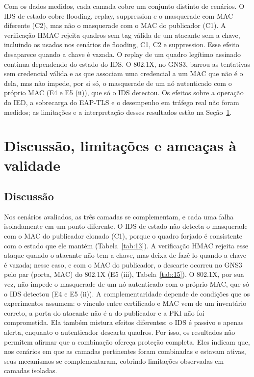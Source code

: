 \documentclass[12pt]{article}
\begin{document}
Com os dados medidos, cada camada cobre um conjunto distinto de cenários. O IDS de estado cobre flooding, replay, suppression e o masquerade com MAC diferente (C2), mas não o masquerade com o MAC do publicador (C1). A verificação HMAC rejeita quadros sem tag válida de um atacante sem a chave, incluindo os usados nos cenários de flooding, C1, C2 e suppression. Esse efeito desaparece quando a chave é vazada. O replay de um quadro legítimo assinado continua dependendo do estado do IDS. O 802.1X, no GNS3, barrou as tentativas sem credencial válida e as que associam uma credencial a um MAC que não é o dela, mas não impede, por si só, o masquerade de um nó autenticado com o próprio MAC (E4 e E5 (ii)), que só o IDS detectou. Os efeitos sobre a operação do IED, a sobrecarga do EAP-TLS e o desempenho em tráfego real não foram medidos; as limitações e a interpretação desses resultados estão na Seção~\ref{sec:7}.

\section{Discussão, limitações e ameaças à validade}\label{sec:7}

\subsection{Discussão}\label{sec:7.1}

Nos cenários avaliados, as três camadas se complementam, e cada uma falha isoladamente em um ponto diferente. O IDS de estado não detecta o masquerade com o MAC do publicador clonado (C1), porque o quadro forjado é consistente com o estado que ele mantém (Tabela~\ref{tab:13}). A verificação HMAC rejeita esse ataque quando o atacante não tem a chave, mas deixa de fazê-lo quando a chave é vazada; nesse caso, e com o MAC do publicador, o descarte ocorreu no GNS3 pelo par (porta, MAC) do 802.1X (E5 (iii), Tabela~\ref{tab:15}). O 802.1X, por sua vez, não impede o masquerade de um nó autenticado com o próprio MAC, que só o IDS detectou (E4 e E5 (ii)). A complementaridade depende de condições que os experimentos assumem: o vínculo entre certificado e MAC vem de um inventário correto, a porta do atacante não é a do publicador e a PKI não foi comprometida. Ela também mistura efeitos diferentes: o IDS é passivo e apenas alerta, enquanto o autenticador descarta quadros. Por isso, os resultados não permitem afirmar que a combinação ofereça proteção completa. Eles indicam que, nos cenários em que as camadas pertinentes foram combinadas e estavam ativas, seus mecanismos se complementaram, cobrindo limitações observadas em camadas isoladas.
\end{document}
